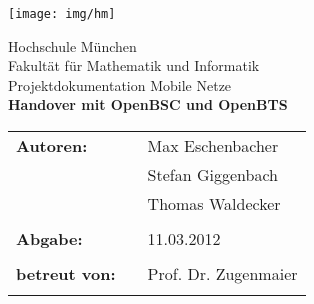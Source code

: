 %
\begin{titlepage}
\begin{flushright}
\texttt{[image: img/hm]}%
\end{flushright}

\vspace*{20mm}
\begin{center}
{\Large Hochschule München}\\
{\large Fakultät für Mathematik und Informatik}\\

\vspace*{15mm}
{\huge Projektdokumentation Mobile Netze}\\

\vspace*{10mm}
{\huge \bfseries{Handover mit OpenBSC und OpenBTS}} \\
\vspace*{15mm} 
\end{center}

\vspace*{30mm}

\begin{tabular}{lll}
\textbf{\large {Autoren:}} & & \large {Max Eschenbacher}\\
			   & & \large {Stefan Giggenbach}\\
			   & & \large {Thomas Waldecker}\\
& & \\

\textbf{\large {Abgabe:}} & & \large {11.03.2012}\\
& & \\

\textbf{\large {betreut von:}} & & \large {Prof. Dr. Zugenmaier}\\
& & \\
\end{tabular}

\end{titlepage}

\tableofcontents
\newpage
